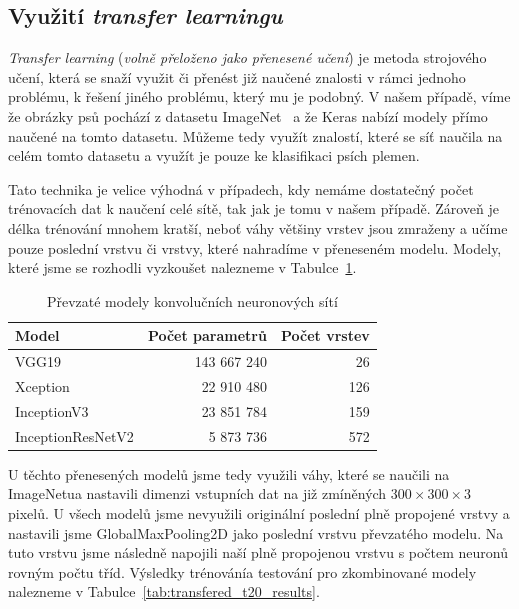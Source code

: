 \documentclass[a4paper,12pt]{article}
\begin{document}
\subsection{Využití \emph{transfer learningu}}
\emph{Transfer learning} (\textit{volně přeloženo jako přenesené učení}) je metoda strojového učení, která se snaží využit či přenést již naučené znalosti v rámci  jednoho problému, k řešení jiného problému, který mu je podobný. V našem případě, víme že obrázky psů pochází z datasetu ImageNet~\cite{imagenet_cvpr09} a že Keras nabízí modely přímo naučené na tomto datasetu. Můžeme tedy využít znalostí, které se síť naučila na celém tomto datasetu a využít je pouze ke klasifikaci psích plemen.

Tato technika je velice výhodná v případech, kdy nemáme dostatečný počet trénovacích dat k naučení celé sítě, tak jak je tomu v našem případě. Zároveň je délka trénování mnohem kratší, neboť váhy většiny vrstev jsou zmraženy a učíme pouze poslední vrstvu či vrstvy, které nahradíme v přeneseném modelu. Modely, které jsme se rozhodli vyzkoušet nalezneme v Tabulce~\ref{tab:transfered_models}.

\begin{table}[h!]
    \centering
    \begin{tabular}{l | r | r}
    \toprule
    Model                                       & Počet parametrů   & Počet vrstev  \\\midrule
    VGG19 \cite{vgg19}                          & 143 667 240       & 26            \\
    Xception  \cite{xception}                   & 22 910 480        & 126           \\
    InceptionV3 \cite{inceptionv3}              & 23 851 784        & 159           \\
    InceptionResNetV2 \cite{inception_resnet}   & 5 873 736         & 572           \\
    \bottomrule
    \end{tabular}
    \caption{Převzaté modely konvolučních neuronových sítí}
    \label{tab:transfered_models}
\end{table}

U těchto přenesených modelů jsme tedy využili váhy, které se naučili na ImageNetu\linebreak a nastavili dimenzi vstupních dat na již zmíněných $300 \times 300 \times 3$ pixelů. U všech modelů jsme nevyužili originální poslední plně propojené vrstvy a nastavili jsme GlobalMaxPooling2D jako poslední vrstvu převzatého modelu. Na tuto vrstvu jsme následně napojili naší plně propojenou vrstvu s počtem neuronů rovným počtu tříd. Výsledky trénování\linebreak a testování pro zkombinované modely nalezneme v Tabulce~\ref{tab:transfered_t20_results}.
\end{document}
